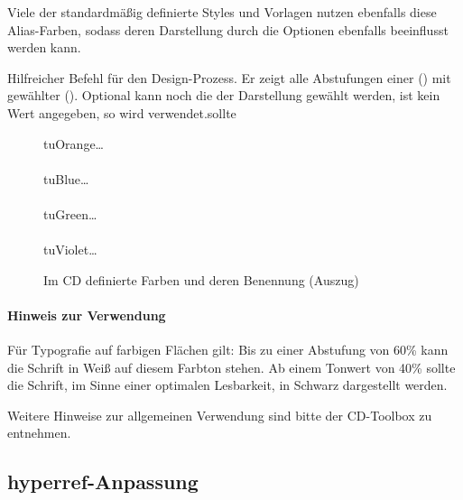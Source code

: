 Viele der standardmäßig definierte Styles und Vorlagen nutzen ebenfalls diese
Alias-Farben, sodass deren Darstellung durch die Optionen ebenfalls beeinflusst 
werden kann.

\begin{Declaration}
\end{Declaration}

\begin{sloppypar}
Hilfreicher Befehl für den Design-Prozess. Er zeigt alle Abstufungen
einer  () mit gewählter 
 ().
Optional kann noch die  der Darstellung gewählt werden,
ist kein Wert angegeben, so wird  verwendet.sollte
\end{sloppypar}

\begin{figure}
  tuOrange\ldots\\
  \\[-1ex]
  tuBlue\ldots\\
  \\[-1ex]
  tuGreen\ldots\\
  \\[-1ex]
  tuViolet\ldots\\
  \caption{Im CD definierte Farben und deren Benennung (Auszug)}
\end{figure}


\paragraph{Hinweis zur Verwendung}

Für Typografie auf farbigen Flächen gilt:
Bis zu einer Abstufung von 60\% kann die Schrift in Weiß auf diesem Farbton stehen.
Ab einem Tonwert von 40\% sollte die Schrift,
im Sinne einer optimalen Lesbarkeit, in Schwarz dargestellt werden. 

Weitere Hinweise zur allgemeinen Verwendung sind bitte der
CD-Toolbox\cite{toolbox} zu entnehmen.

\subsection{hyperref-Anpassung}

